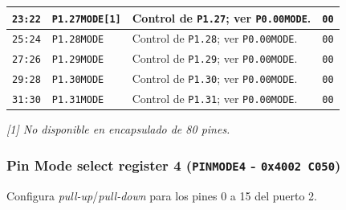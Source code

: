\begin{longtable}{|>{\raggedright\arraybackslash}p{}|>{\raggedright\arraybackslash}p{}|>{\raggedright\arraybackslash}p{}|>{\centering\arraybackslash}p{}|}
\hline
\texttt{23:22} & \texttt{P1.27MODE[1]} & Control de \texttt{P1.27}; ver \texttt{P0.00MODE}. & \texttt{00} \\
\hline
\texttt{25:24} & \texttt{P1.28MODE} & Control de \texttt{P1.28}; ver \texttt{P0.00MODE}. & \texttt{00} \\
\hline
\texttt{27:26} & \texttt{P1.29MODE} & Control de \texttt{P1.29}; ver \texttt{P0.00MODE}. & \texttt{00} \\
\hline
\texttt{29:28} & \texttt{P1.30MODE} & Control de \texttt{P1.30}; ver \texttt{P0.00MODE}. & \texttt{00} \\
\hline
\texttt{31:30} & \texttt{P1.31MODE} & Control de \texttt{P1.31}; ver \texttt{P0.00MODE}. & \texttt{00} \\
\hline
\end{longtable}
\noindent\textit{[1] No disponible en encapsulado de 80 pines.}

\subsubsection{Pin Mode select register 4 (\texttt{PINMODE4} - \texttt{0x4002 C050})}
Configura \textit{pull-up}/\textit{pull-down} para los pines 0 a 15 del puerto 2.

